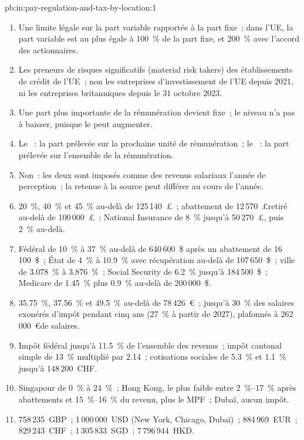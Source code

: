\begin{solution}{pb:in:pay-regulation-and-tax-by-location:1}
\begin{enumerate}
\item Une limite légale sur la part variable rapportée à la part fixe~; dans l'UE, la part variable est au plus égale à 100~\% de la part fixe, et 200~\% avec l'accord des actionnaires.
\item Les preneurs de risques significatifs (material risk takers) des établissements de crédit de l'UE~; non les entreprises d'investissement de l'UE depuis 2021, ni les entreprises britanniques depuis le 31 octobre 2023.
\item Une part plus importante de la rémunération devient fixe~; le niveau n'a pas à baisser, puisque le  peut augmenter.
\item Le ~: la part prélevée sur la prochaine unité de rémunération~; le ~: la part prélevée sur l'ensemble de la rémunération.
\item Non~: les deux sont imposés comme des revenus salariaux l'année de perception~; la retenue à la source peut différer au cours de l'année.
\item 20~\%, 40~\% et 45~\% au-delà de 125\,140~\pounds~; abattement de 12\,570~\pounds retiré au-delà de 100\,000~\pounds~; National Insurance de 8~\% jusqu'à
50\,270~\pounds, puis 2~\% au-delà.
\item Fédéral de 10~\% à 37~\% au-delà de 640\,600~\$ après un abattement de 16\,100~\$~; État de 4~\% à 10.9~\% avec récupération au-delà de 107\,650~\$~;
ville de 3.078~\% à 3.876~\%~; Social Security de 6.2~\% jusqu'à 184\,500~\$~; Medicare de 1.45~\% plus 0.9~\% au-delà de 200\,000~\$.
\item 35.75~\%, 37.56~\% et 49.5~\% au-delà de 78\,426~\euro~; jusqu'à 30~\% des salaires exonérés d'impôt pendant cinq ans (27~\% à partir de 2027), plafonnés à
262\,000~\euro de salaires.
\item Impôt fédéral jusqu'à 11.5~\% de l'ensemble des revenus~; impôt cantonal simple de 13~\% multiplié par 2.14~; cotisations sociales de 5.3~\% et 1.1~\% jusqu'à
148\,200~CHF.
\item Singapour de 0~\% à 24~\%~; Hong Kong, le plus faible entre 2~\%--17~\% après abattements et 15~\%--16~\% du revenu, plus le MPF~; Dubaï, aucun impôt.
\item 758\,235~GBP~; 1\,000\,000~USD (New York, Chicago, Dubaï)~; 884\,969~EUR~; 829\,243~CHF~; 1\,305\,833~SGD~; 7\,796\,944~HKD.

\end{enumerate}
\end{solution}
